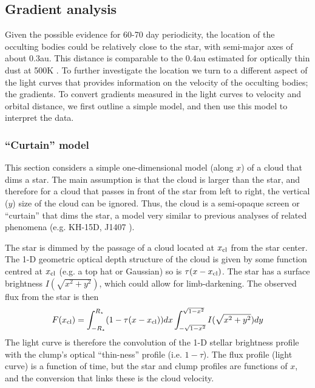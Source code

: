 \documentclass[]{rsos}
\begin{document}
\subsection{Gradient analysis}\label{ss:grad}

Given the possible evidence for 60-70 day periodicity, the location of the occulting
bodies could be relatively close to the star, with semi-major axes of about 0.3au. This
distance is comparable to the 0.4au estimated for optically thin dust at 500K
\cite{2013A&A...553L...1D}. To further investigate the location we turn to a different
aspect of the light curves that provides information on the velocity of the occulting
bodies; the gradients. To convert gradients measured in the light curves to velocity and
orbital distance, we first outline a simple model, and then use this model to interpret
the data.

\subsubsection{``Curtain'' model}\label{sss:curtain}

This section considers a simple one-dimensional model (along $x$) of a cloud that dims a
star. The main assumption is that the cloud is larger than the star, and therefore for a
cloud that passes in front of the star from left to right, the vertical ($y$) size of the
cloud can be ignored. Thus, the cloud is a semi-opaque screen or ``curtain'' that dims
the star, a model very similar to previous analyses of related phenomena (e.g. KH-15D,
J1407 \cite{2006ApJ...644..510W,2014MNRAS.441.2845V,2015ApJ...800..126K}).

The star is dimmed by the passage of a cloud located at $x_{\rm cl}$ from the star
center. The 1-D geometric optical depth structure of the cloud is given by some function
centred at $x_{\rm cl}$ (e.g. a top hat or Gaussian) so is $\tau(x-x_{\rm cl})$. The star
has a surface brightness $I(\sqrt{x^2+y^2})$, which could allow for limb-darkening. The
observed flux from the star is then
\begin{equation}\label{eq:f}
  F(x_{\rm cl}) = \int_{-R_\star}^{R_\star} (1-\tau(x-x_{\rm cl})) dx \int_{-\sqrt{1-x^2}}^{\sqrt{1-x^2}} I(\sqrt{x^2+y^2}) dy
\end{equation}
The light curve is therefore the convolution of the 1-D stellar brightness profile with
the clump's optical ``thin-ness'' profile (i.e. $1-\tau$). The flux profile (light curve)
is a function of time, but the star and clump profiles are functions of $x$, and the
conversion that links these is the cloud velocity.
\end{document}
